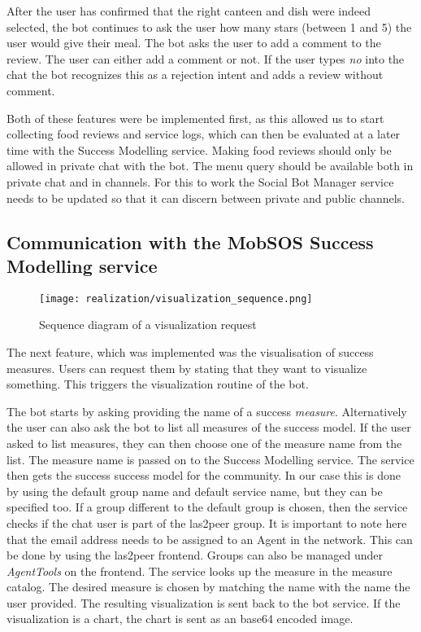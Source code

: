 After the user has confirmed that the right canteen and dish were indeed selected, the bot continues to ask the user how many stars (between 1 and 5) the user would give their meal. 
The bot asks the user to add a comment to the review. The user can either add a comment or not. If the user types \emph{no} into the chat the bot recognizes this as a rejection intent and adds a review without comment.

Both of these features were be implemented first, as this allowed us to start collecting food reviews and service logs, which can then be evaluated at a later time with the Success Modelling service.
Making food reviews should only be allowed in private chat with the bot. 
The menu query should be available both in private chat and in channels.
For this to work the Social Bot Manager service needs to be updated so that it can discern between private and public channels.

\subsection{Communication with the MobSOS Success Modelling service}

\begin{figure}[h]
    \centering
    \texttt{[image: realization/visualization\_sequence.png]}
    \caption{Sequence diagram of a visualization request}
    \label{fig:addReview}
\end{figure}

The next feature, which was implemented was the visualisation of success measures. Users can request them by stating that they want to visualize something.
This triggers the visualization routine of the bot.

The bot starts by asking providing the name of a success \emph{measure}. Alternatively the user can also ask the bot to list all measures of the success model.
If the user asked to list measures, they can then choose one of the measure name from the list. 
The measure name is passed on to the Success Modelling service. The service then gets the success success model for the community. In our case this is done by using the default group name and default service name, but they can be specified too.
If a group different to the default group is chosen, then the service checks if the chat user is part of the las2peer group. 
It is important to note here that the email address needs to be assigned to an Agent in the network. 
This can be done by using the las2peer frontend. 
Groups can also be managed under \emph{AgentTools} on the frontend.  
The service looks up the measure in the measure catalog. The desired measure is chosen by matching the name with the name the user provided. 
The resulting visualization is sent back to the bot service. If the visualization is a chart, the chart is sent as an base64 encoded image.

